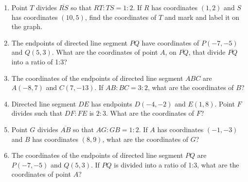 \begin{enumerate}
\item Point $T$ divides $\overline{RS}$ so that $RT:TS = 1:2$. If $R$ has coordinates $(1,2)$ and $S$ has coordinates $(10,5)$, find the coordinates of $T$ and mark and label it on the graph.
\begin{flushright}
\end{flushright} 
    
\item The endpoints of directed line segment $PQ$ have coordinates of
$P(-7,-5)$ and $Q(5,3)$. What are the coordinates of point $A$, on $\overline{PQ}$, that divide $\overline{PQ}$ into a ratio of 1:3?

\newpage
\item The coordinates of the endpoints of directed line segment $ABC$ are $A(-8,7)$ and $C(7,-13)$. If $AB:BC = 3:2$, what are the coordinates of $B$? \vspace{5cm}

\item Directed line segment $DE$ has endpoints $D(-4, -2)$ and $E(1,8)$.
Point $F$ divides such that $DF:FE$ is $2:3$. What are the coordinates
of $F$? \vspace{5cm}

\item Point $G$ divides $\overline{AB}$ so that $AG:GB = 1:2$. If $A$ has coordinates $(-1,-3)$ and $B$ has coordinates $(8,9)$, what are the coordinates of $G$? \vspace{5cm}

\item The coordinates of the endpoints of directed line segment $PQ$ are $P(-7,-5)$ and $Q(5,3)$. If $PQ$ is divided into a ratio of 1:3, what are the coordinates of point $A$? \vspace{5cm}


\end{enumerate}
